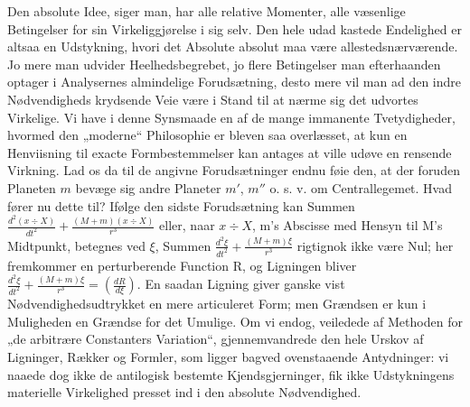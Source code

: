 \documentclass[12pt,a4paper]{book}
\begin{document}
Den absolute Idee, siger man, har alle relative Momenter, alle væsenlige
Betingelser for sin Virkeliggjørelse i sig selv. Den hele udad kastede
Endelighed er altsaa en Udstykning, hvori det Absolute absolut maa være
allestedsnærværende. Jo mere man udvider Heelhedsbegrebet, jo flere
Betingelser man efterhaanden optager i Analysernes almindelige
Forudsætning, desto mere vil man ad den indre Nødvendigheds krydsende
Veie være i Stand til at nærme sig det udvortes Virkelige. Vi have i
denne Synsmaade en af de mange immanente Tvetydigheder, hvormed den
„moderne“ Philosophie er bleven saa overlæsset, at kun en Henviisning
til exacte Formbestemmelser kan antages at ville udøve en
rensende Virkning. Lad os da til de angivne Forudsætninger endnu føie
den, at der foruden Planeten $m$ bevæge sig andre Planeter $m'$, $m''$
o. s. v. om Centrallegemet. Hvad fører nu dette til? Ifølge den sidste
Forudsætning kan Summen
$\frac{d^{2}(x \div X)}{dt^{2}} + \frac{(M + m)(x \div X)}{r^{3}}$
eller, naar $x \div X$, m's Abscisse med Hensyn til M's Midtpunkt,
betegnes ved $\xi$, Summen
$\frac{d^{2}\xi}{dt^{2}} + \frac{(M + m)\xi}{r^{3}}$ rigtignok ikke være
Nul; her fremkommer en perturberende Function R, og Ligningen bliver
$\frac{d^{2}\xi}{dt^{2}} + \frac{(M + m)\xi}{r^{3}} =
\left(\frac{dR}{d\xi}\right)$. En saadan Ligning giver ganske vist
Nødvendighedsudtrykket en mere articuleret Form; men Grændsen er kun i
Muligheden en Grændse for det Umulige. Om vi endog, veiledede af Methoden
for „de arbitrære Constanters Variation“, gjennemvandrede den hele Urskov
af Ligninger, Rækker og Formler, som ligger bagved ovenstaaende
Antydninger: vi naaede dog ikke de antilogisk bestemte Kjendsgjerninger,
fik ikke Udstykningens materielle Virkelighed presset ind i den absolute
Nødvendighed.
\end{document}
